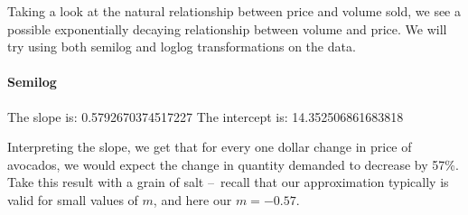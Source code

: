\documentclass[letterpaper,10pt,english]{jupyterBook}
\begin{document}
\sphinxAtStartPar
Taking a look at the natural relationship between price and volume sold, we see a possible exponentially decaying relationship between volume and price. We will try using both semi\sphinxhyphen{}log and log\sphinxhyphen{}log transformations on the data.

\begin{sphinxVerbatim}[commandchars=\\\{\}]
 
\end{sphinxVerbatim}

\noindent{}


\paragraph{Semi\sphinxhyphen{}log}
\label{\detokenize{content/01-demand/03-log-log:semi-log}}
\begin{sphinxVerbatim}[commandchars=\\\{\}]
  

     
 
 
\end{sphinxVerbatim}

\begin{sphinxVerbatim}[commandchars=\\\{\}]
The slope is:  \PYGZhy{}0.5792670374517227
The intercept is:  14.352506861683818
\end{sphinxVerbatim}

\sphinxAtStartPar
Interpreting the slope, we get that for every one dollar change in price of avocados, we would expect the change in quantity demanded to decrease by 57\%. Take this result with a grain of salt – recall that our approximation typically is valid for small values of \(m\), and here our \(m=-0.57\).
\end{document}
